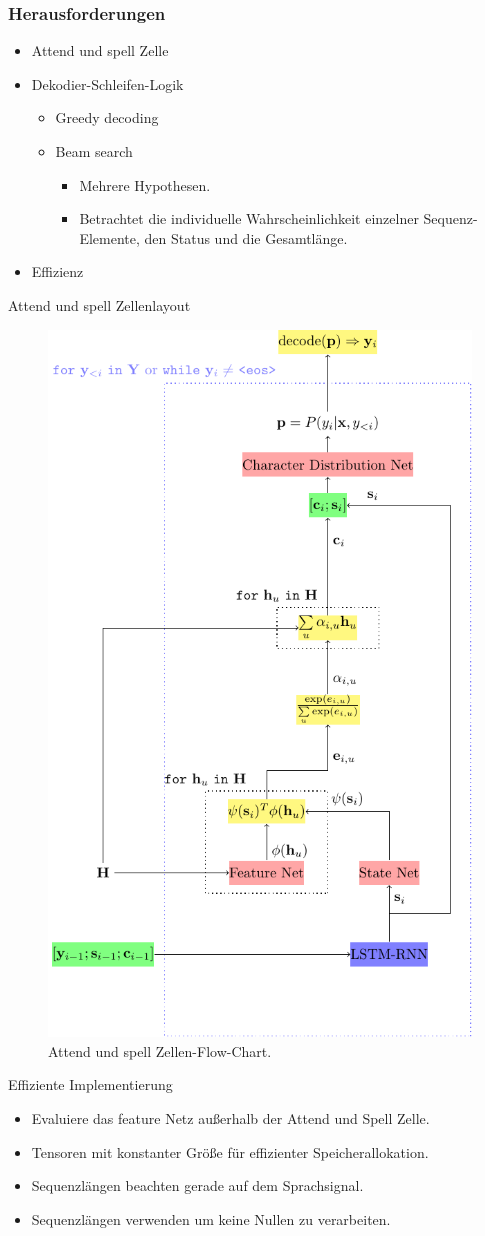 \documentclass[10pt]{beamer}
\begin{document}
\begin{frame}[fragile]
\frametitle{Herausforderungen}
\begin{itemize}

\item Attend und spell Zelle
\item Dekodier-Schleifen-Logik
	\begin{itemize}
	\item Greedy decoding
	\item Beam search
		\begin{itemize}
		\item Mehrere Hypothesen.
		\item Betrachtet die individuelle Wahrscheinlichkeit einzelner
			  Sequenz-Elemente, den Status und die Gesamtlänge.
		\end{itemize}
	\end{itemize}
\item Effizienz
\end{itemize}
\end{frame}

\begin{frame}{Attend und spell Zellenlayout}
	\begin{figure}
	\includegraphics[height=6.5 cm]{../tikz/asCellType1}
	\caption{Attend und spell Zellen-Flow-Chart.}
	\end{figure}
\end{frame}

\begin{frame}{Effiziente Implementierung}
	\begin{itemize}
		\item Evaluiere das feature Netz außerhalb der Attend und Spell
			  Zelle.
		\item Tensoren mit konstanter Größe für effizienter
			  Speicherallokation.
		\item Sequenzlängen beachten gerade auf dem Sprachsignal.
		\item Sequenzlängen verwenden um keine Nullen zu verarbeiten.
	\end{itemize}
\end{frame}
\end{document}

